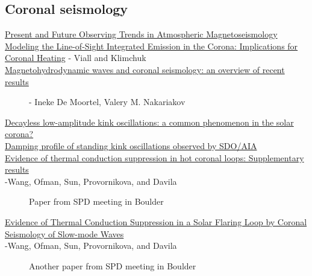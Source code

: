 \documentclass{article}
\begin{document}
\subsection{Coronal seismology}
\begin{description}
    \item [\href{http://link.springer.com/article/10.1007\%2Fs11207-007-9029-z}
        {Present and Future Observing Trends in Atmospheric Magnetoseismology}]
    \item [\href{http://arxiv.org/abs/1304.5439}
        {Modeling the Line-of-Sight Integrated Emission in the Corona:
        Implications for Coronal Heating}
        - Viall and Klimchuk]
    \item [\href{http://rsta.royalsocietypublishing.org/content/370/1970/3193}
        {Magnetohydrodynamic waves and coronal seismology: an overview of recent results}]
        - Ineke De Moortel, Valery M. Nakariakov
    \item [\href{http://arxiv.org/abs/1509.05519}
        {Decayless low-amplitude kink oscillations: a common phenomenon in the solar corona?}]
    \item [\href{http://adsabs.harvard.edu/abs/2016A\%26A...585L...6P}
        {Damping profile of standing kink oscillations observed by SDO/AIA}]
    \item [\href{http://cdsads.u-strasbg.fr/abs/2015arXiv151002750W}
        {Evidence of thermal conduction suppression in hot coronal loops:
            Supplementary results}\\
        -Wang, Ofman, Sun, Provornikova, and Davila]
        Paper from SPD meeting in Boulder
	\item [\href{http://cdsads.u-strasbg.fr/abs/2015ApJ...811L..13W`}
        {Evidence of Thermal Conduction Suppression in a Solar Flaring
            Loop by Coronal Seismology of Slow-mode Waves}\\
        -Wang, Ofman, Sun, Provornikova, and Davila]
        Another paper from SPD meeting in Boulder
\end{description}
\end{document}
